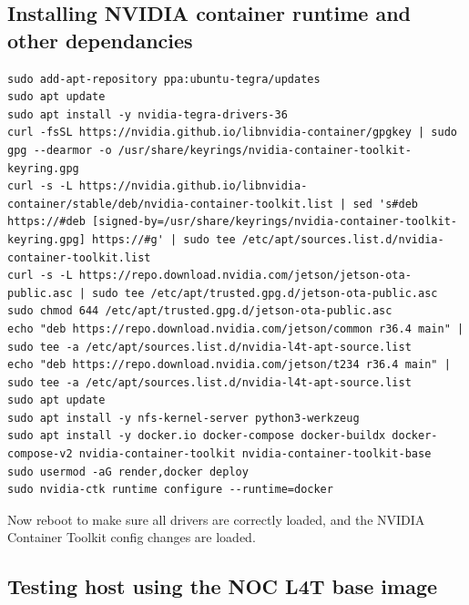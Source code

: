 \documentclass[11pt]{article}
\begin{document}
\subsection{Installing NVIDIA container runtime and other dependancies}



\lstset{style=console}
\begin{lstlisting}
sudo add-apt-repository ppa:ubuntu-tegra/updates
sudo apt update
sudo apt install -y nvidia-tegra-drivers-36
curl -fsSL https://nvidia.github.io/libnvidia-container/gpgkey | sudo gpg --dearmor -o /usr/share/keyrings/nvidia-container-toolkit-keyring.gpg
curl -s -L https://nvidia.github.io/libnvidia-container/stable/deb/nvidia-container-toolkit.list | sed 's#deb https://#deb [signed-by=/usr/share/keyrings/nvidia-container-toolkit-keyring.gpg] https://#g' | sudo tee /etc/apt/sources.list.d/nvidia-container-toolkit.list
curl -s -L https://repo.download.nvidia.com/jetson/jetson-ota-public.asc | sudo tee /etc/apt/trusted.gpg.d/jetson-ota-public.asc
sudo chmod 644 /etc/apt/trusted.gpg.d/jetson-ota-public.asc
echo "deb https://repo.download.nvidia.com/jetson/common r36.4 main" | sudo tee -a /etc/apt/sources.list.d/nvidia-l4t-apt-source.list
echo "deb https://repo.download.nvidia.com/jetson/t234 r36.4 main" | sudo tee -a /etc/apt/sources.list.d/nvidia-l4t-apt-source.list
sudo apt update
sudo apt install -y nfs-kernel-server python3-werkzeug
sudo apt install -y docker.io docker-compose docker-buildx docker-compose-v2 nvidia-container-toolkit nvidia-container-toolkit-base
sudo usermod -aG render,docker deploy
sudo nvidia-ctk runtime configure --runtime=docker
\end{lstlisting}

Now reboot to make sure all drivers are correctly loaded, and the NVIDIA Container Toolkit config changes are loaded.


\subsection{Testing host using the NOC L4T base image}
\end{document}

